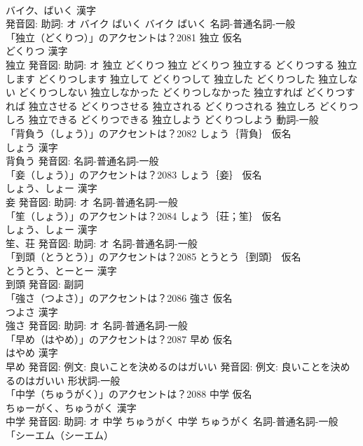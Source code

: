 \documentclass[8pt]{extreport}
\begin{document}
\begin{CJK}{UTF8}{min}
\\	バイク、ばいく 漢字　
\\	発音図: 助詞: オ	バイク ばいく		バイク ばいく				名詞-普通名詞-一般 
\\	「独立（どくりつ）」のアクセントは？2081	独立 仮名　
\\	どくりつ 漢字　
\\	独立 発音図: 助詞: オ	独立 どくりつ		独立 どくりつ 独立する どくりつする 独立します どくりつします 独立して どくりつして 独立した どくりつした 独立しない どくりつしない 独立しなかった どくりつしなかった 独立すれば どくりつすれば 独立させる どくりつさせる 独立される どくりつされる 独立しろ どくりつしろ 独立できる どくりつできる 独立しよう どくりつしよう				動詞-一般 
\\	「背負う（しょう）」のアクセントは？2082	しょう｛背負｝ 仮名　
\\	しょう 漢字　
\\	背負う 発音図:							名詞-普通名詞-一般 
\\	「妾（しょう）」のアクセントは？2083	しょう｛妾｝ 仮名　
\\	しょう、しょー 漢字　
\\	妾 発音図: 助詞: オ							名詞-普通名詞-一般 
\\	「笙（しょう）」のアクセントは？2084	しょう｛荘；笙｝ 仮名　
\\	しょう、しょー 漢字　
\\	笙、荘 発音図: 助詞: オ							名詞-普通名詞-一般 
\\	「到頭（とうとう）」のアクセントは？2085	とうとう｛到頭｝ 仮名　
\\	とうとう、とーとー 漢字　
\\	到頭 発音図:							副詞 
\\	「強さ（つよさ）」のアクセントは？2086	強さ 仮名　
\\	つよさ 漢字　
\\	強さ 発音図: 助詞: オ							名詞-普通名詞-一般 
\\	「早め（はやめ）」のアクセントは？2087	早め 仮名　
\\	はやめ 漢字　
\\	早め 発音図: 例文: 良いことを決めるのはガいい 発音図: 例文: 良いことを決めるのはガいい							形状詞-一般 
\\	「中学（ちゅうがく）」のアクセントは？2088	中学 仮名　
\\	ちゅーがく、ちゅうがく 漢字　
\\	中学 発音図: 助詞: オ	中学 ちゅうがく		中学 ちゅうがく				名詞-普通名詞-一般 
\\	「シーエム（シーエム）

\end{CJK}
\end{document}
